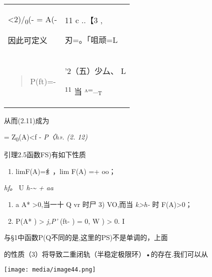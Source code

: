 \documentclass{article}
\begin{document}
\begin{longtable}[]{@{}ll@{}}
\toprule
\endhead
\begin{minipage}[t]{0.47\columnwidth}\raggedright
\textless{}2)/\textsubscript{0}(-\textbar{}\textbar{} = A(-

因此可定义\strut
\end{minipage} & \begin{minipage}[t]{0.47\columnwidth}\raggedright
11 c ..【3 ,

刃=。「咀顽=L\strut
\end{minipage}\tabularnewline
\begin{minipage}[t]{0.47\columnwidth}\raggedright
\begin{quote}
P(ft)=-
\end{quote}\strut
\end{minipage} & \begin{minipage}[t]{0.47\columnwidth}\raggedright
{'2（五）}少厶、 L

\textsuperscript{11} 当 \textsc{\textsuperscript{a=\_}t}\strut
\end{minipage}\tabularnewline
\bottomrule
\end{longtable}

从而(2.11)成为

= Z\textsubscript{0}(A)\textless{}f - \emph{P〈h». (2. 12)}

引理2.5函数FS)有如下性质

\begin{enumerate}
\def\labelenumi{(\arabic{enumi})}
\item
  limF(A)=纟，lim F(A) =+ oo；
\end{enumerate}

\emph{hf。} U \emph{h-\textasciitilde{} + aa}

\begin{enumerate}
\def\labelenumi{(\arabic{enumi})}
\setcounter{enumi}{1}
\item
  a A* \textgreater{}0,当一十 Q vr 时尸 3) VO,而当
  \emph{k\textgreater{}h-} 时 F(A)\textgreater{}0；
\item
  P(A* ) \textgreater{} \emph{j,P'} (ft- ) = 0, W ) \textgreater{} 0. I
\end{enumerate}

与§1中函数P(Q不同的是,这里的PS)不是单调的，上面

的性质（3）将导致二重闭轨（半稳定极限环）•的存在.我们可以从

\texttt{[image: media/image44.png]}
\end{document}
